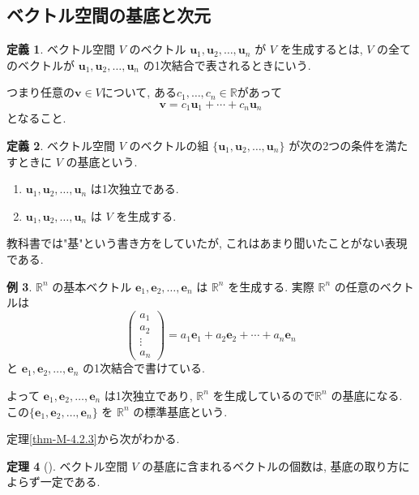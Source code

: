 \documentclass[dvipdfmx,a4paper,11pt]{article} %
\newcommand{\R}{\mathbb{R}}
\theoremstyle{definition}
\newtheorem{thm}{定理}[section]
\newtheorem{defn}[thm]{定義}
\newtheorem{ex}[thm]{例}
\begin{document}
\subsection{ベクトル空間の基底と次元  \cite[4.4節]{M}}

\begin{defn}
ベクトル空間 $V$ のベクトル $\bm{u}_1,\bm{u}_2,\ldots,\bm{u}_n$ が $V$ を生成するとは, $V$ の全てのベクトルが $\bm{u}_1,\bm{u}_2,\ldots,\bm{u}_n$ の1次結合で表されるときにいう.

つまり任意の$\bm{v} \in V$について, ある$c_1, \ldots, c_n \in \R$があって
$$
\bm{v}=c_1\bm{u}_1+\cdots +c_n \bm{u}_n
$$
となること. 
\end{defn}

\begin{defn}
ベクトル空間 $V$ のベクトルの組 $\{\bm{u}_1,\bm{u}_2,\ldots,\bm{u}_n\}$ が次の2つの条件を満たすときに $V$ の基底という.
\begin{enumerate}
\item[(1)] $\bm{u}_1,\bm{u}_2,\ldots,\bm{u}_n$ は1次独立である.
\item[(2)] $\bm{u}_1,\bm{u}_2,\ldots,\bm{u}_n$ は $V$ を生成する.
\end{enumerate}
\end{defn}
教科書では"基"という書き方をしていたが, これはあまり聞いたことがない表現である. 

\begin{ex}
$\mathbb{R}^n$ の基本ベクトル $\bm{e}_1,\bm{e}_2,\ldots,\bm{e}_n$ は $\mathbb{R}^n$ を生成する. 実際 $\mathbb{R}^n$ の任意のベクトルは
\[
\begin{pmatrix}
a_1\\
a_2\\
\vdots\\
a_n
\end{pmatrix}
=
a_1\bm{e}_1+a_2\bm{e}_2+\cdots+a_n\bm{e}_n
\]
と $\bm{e}_1,\bm{e}_2,\ldots,\bm{e}_n$ の1次結合で書けている.

よって $\bm{e}_1,\allowbreak\bm{e}_2,\allowbreak\ldots,\allowbreak\bm{e}_n$ は1次独立であり, $\mathbb{R}^n$ を生成しているので$\mathbb{R}^n$ の基底になる. 
この$\{\bm{e}_1,\allowbreak\bm{e}_2,\allowbreak\ldots,\allowbreak\bm{e}_n\}$ を $\mathbb{R}^n$ の標準基底という.
\end{ex}


定理\ref{thm-M-4.2.3}から次がわかる. 
\begin{thm}
[{\cite[定理4.4.1]{M}}] 
ベクトル空間 $V$ の基底に含まれるベクトルの個数は, 基底の取り方によらず一定である.
\end{thm}
\end{document}
